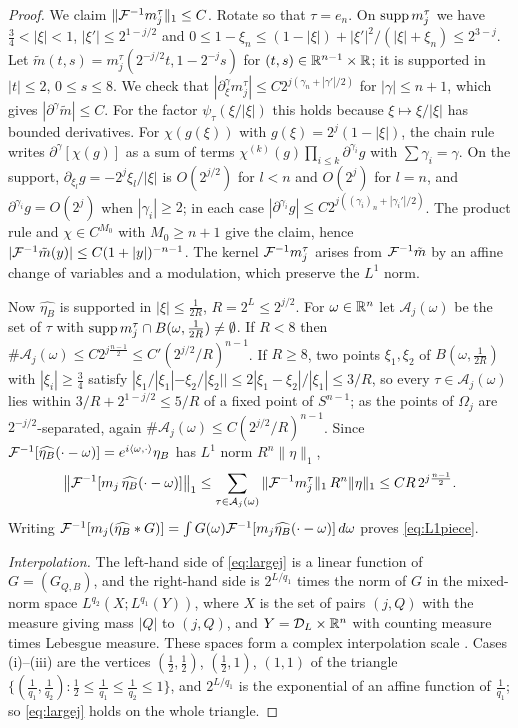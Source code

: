 \begin{proof}
We claim $\|\mathcal F^{-1}m_j^\tau\|_1\le C$. Rotate so that $\tau=e_n$. On $\operatorname{supp} m_j^\tau$ we have $\frac34<|\xi|<1$,
$|\xi'|\le2^{1-j/2}$ and $0\le1-\xi_n\le(1-|\xi|)+|\xi'|^2/(|\xi|+\xi_n)\le2^{3-j}$. Let
$\tilde m(t,s)=m_j^\tau(2^{-j/2}t,1-2^{-j}s)$ for $(t,s)\in\mathbb{R}^{n-1}\times\mathbb{R}$; it is supported in $|t|\le2$,
$0\le s\le8$. We check that $|\partial_\xi^\gamma m_j^\tau|\le C2^{j(\gamma_n+|\gamma'|/2)}$ for $|\gamma|\le n+1$, which gives
$|\partial^\gamma\tilde m|\le C$. For the factor $\psi_\tau(\xi/|\xi|)$ this holds because $\xi\mapsto\xi/|\xi|$ has bounded
derivatives. For $\chi(g(\xi))$ with $g(\xi)=2^j(1-|\xi|)$, the chain rule writes $\partial^\gamma[\chi(g)]$ as a sum of
terms $\chi^{(k)}(g)\prod_{i\le k}\partial^{\gamma_i}g$ with $\sum\gamma_i=\gamma$. On the support,
$\partial_{\xi_l}g=-2^j\xi_l/|\xi|$ is $O(2^{j/2})$ for $l<n$ and $O(2^j)$ for $l=n$, and $\partial^{\gamma_i}g=O(2^j)$
when $|\gamma_i|\ge2$; in each case $|\partial^{\gamma_i}g|\le C2^{j((\gamma_i)_n+|\gamma_i'|/2)}$. The product rule and
$\chi\in C^{M_0}$ with $M_0\ge n+1$ give the claim, hence $|\mathcal F^{-1}\tilde m(y)|\le C(1+|y|)^{-n-1}$. The kernel
$\mathcal F^{-1}m_j^\tau$ arises from $\mathcal F^{-1}\tilde m$ by an affine change of variables and a modulation, which preserve
the $L^1$ norm.

Now $\widehat{\eta_B}$ is supported in $|\xi|\le\frac1{2R}$, $R=2^L\le2^{j/2}$. For $\omega\in\mathbb{R}^n$ let
$\mathcal A_j(\omega)$ be the set of $\tau$ with $\operatorname{supp} m_j^\tau\cap B(\omega,\frac1{2R})\ne\emptyset$. If $R<8$ then
$\#\mathcal A_j(\omega)\le C2^{j\frac{n-1}2}\le C'(2^{j/2}/R)^{n-1}$. If $R\ge8$, two points $\xi_1,\xi_2$ of
$B(\omega,\frac1{2R})$ with $|\xi_i|\ge\frac34$ satisfy $|\xi_1/|\xi_1|-\xi_2/|\xi_2||\le2|\xi_1-\xi_2|/|\xi_1|\le3/R$, so
every $\tau\in\mathcal A_j(\omega)$ lies within $3/R+2^{1-j/2}\le5/R$ of a fixed point of $S^{n-1}$; as the points of
$\Omega_j$ are $2^{-j/2}$-separated, again $\#\mathcal A_j(\omega)\le C(2^{j/2}/R)^{n-1}$. Since
$\mathcal F^{-1}[\widehat{\eta_B}(\cdot-\omega)]=e^{i\langle \omega,\cdot\rangle}\eta_B$ has $L^1$ norm $R^n\|\eta\|_1$,
\[
\bigl\|\mathcal F^{-1}[m_j\,\widehat{\eta_B}(\cdot-\omega)]\bigr\|_1\le\sum_{\tau\in\mathcal A_j(\omega)}\|\mathcal F^{-1}m_j^\tau\|_1\,R^n\|\eta\|_1
\le CR\,2^{j\frac{n-1}2} .
\]
Writing $\mathcal F^{-1}[m_j(\widehat{\eta_B}*G)]=\int G(\omega)\mathcal F^{-1}[m_j\widehat{\eta_B}(\cdot-\omega)]\,d\omega$ proves
\eqref{eq:L1piece}.

\emph{Interpolation.} The left-hand side of \eqref{eq:largej} is a linear function of
$G=(G_{Q,B})$, and the right-hand side is $2^{L/q_1}$ times the norm of $G$ in the mixed-norm space
$L^{q_2}(X;L^{q_1}(Y))$, where $X$ is the set of pairs $(j,Q)$ with the measure giving mass $|Q|$ to $(j,Q)$,
and $Y=\mathcal D_L\times\mathbb{R}^n$ with counting measure times Lebesgue measure. These spaces form a complex
interpolation scale \cite{BP61}. Cases (i)--(iii) are the vertices $(\frac12,\frac12)$, $(\frac12,1)$, $(1,1)$ of the
triangle $\{(\frac1{q_1},\frac1{q_2}):\frac12\le\frac1{q_1}\le\frac1{q_2}\le1\}$, and $2^{L/q_1}$ is the exponential of an
affine function of $\frac1{q_1}$; so \eqref{eq:largej} holds on the whole triangle.
\end{proof}

